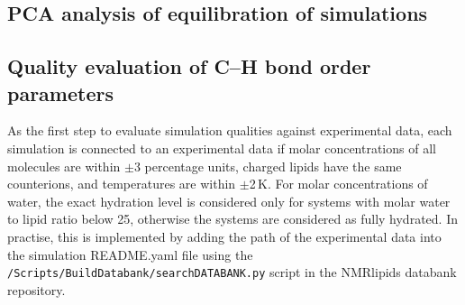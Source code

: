\documentclass[fleqn,10pt]{wlscirep}
\begin{document}
\subsection{PCA analysis of equilibration of simulations}

\subsection{Quality evaluation of C--H bond order parameters}
As the first step to evaluate simulation qualities against experimental data, each simulation is connected to an experimental data if molar concentrations of all molecules are within $\pm$3 percentage units, charged lipids have the same counterions, and temperatures are within $\pm$2\,K. For molar concentrations of water, the exact hydration level is considered only for systems with molar water to lipid ratio below 25, otherwise the systems are considered as fully hydrated. In practise, this is implemented by adding the path of the experimental data into the simulation README.yaml file using the \texttt{/Scripts/BuildDatabank/searchDATABANK.py} script in the NMRlipids databank repository. 
\end{document}
